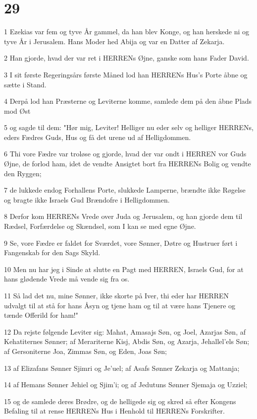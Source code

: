 \chapter{29}

\par 1 Ezekias var fem og tyve År gammel, da han blev Konge, og han herskede ni og tyve År i Jerusalem. Hans Moder hed Abija og var en Datter af Zekarja.
\par 2 Han gjorde, hvad der var ret i HERRENs Øjne, ganske som hans Fader David.
\par 3 I sit første Regeringsårs første Måned lod han HERRENs Hus's Porte åbne og sætte i Stand.
\par 4 Derpå lod han Præsterne og Leviterne komme, samlede dem på den åbne Plads mod Øst
\par 5 og sagde til dem: "Hør mig, Leviter! Helliger nu eder selv og helliger HERRENs, eders Fædres Guds, Hus og få det urene ud af Helligdommen.
\par 6 Thi vore Fædre var troløse og gjorde, hvad der var ondt i HERREN vor Guds Øjne, de forlod ham, idet de vendte Ansigtet bort fra HERRENs Bolig og vendte den Ryggen;
\par 7 de lukkede endog Forhallens Porte, slukkede Lamperne, brændte ikke Røgelse og bragte ikke Israels Gud Brændofre i Helligdommen.
\par 8 Derfor kom HERRENs Vrede over Juda og Jerusalem, og han gjorde dem til Rædsel, Forfærdelse og Skændsel, som I kan se med egne Øjne.
\par 9 Se, vore Fædre er faldet for Sværdet, vore Sønner, Døtre og Hustruer ført i Fangenskab for den Sags Skyld.
\par 10 Men nu har jeg i Sinde at slutte en Pagt med HERREN, Israels Gud, for at hans glødende Vrede må vende sig fra os.
\par 11 Så lad det nu, mine Sønner, ikke skorte på Iver, thi eder har HERREN udvalgt til at stå for hans Åsyn og tjene ham og til at være hans Tjenere og tænde Offerild for ham!"
\par 12 Da rejste følgende Leviter sig: Mahat, Amasajs Søn, og Joel, Azarjas Søn, af Kehatiternes Sønner; af Merariterne Kisj, Abdis Søn, og Azarja, Jehallel'els Søn; af Gersoniterne Joa, Zimmas Søn, og Eden, Joas Søn;
\par 13 af Elizafans Sønner Sjimri og Je'uel; af Asafs Sønner Zekarja og Mattanja;
\par 14 af Hemans Sønner Jehiel og Sjim'i; og af Jedutuns Sønner Sjemaja og Uzziel;
\par 15 og de samlede deres Brødre, og de helligede sig og skred så efter Kongens Befaling til at rense HERRENs Hus i Henhold til HERRENs Forskrifter.
